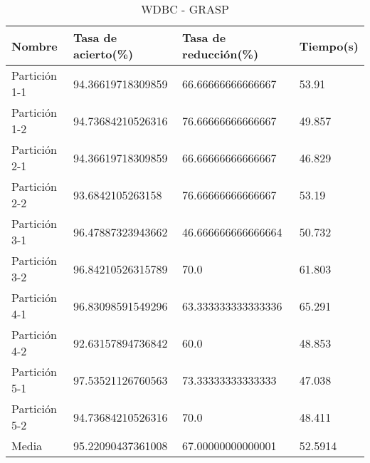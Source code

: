 \begin{table}[H]
	\centering
	\begin{tabular}{l|lll}
		Nombre        & Tasa de acierto(\%) & Tasa de reducción(\%) & Tiempo(s) \\ \hline
		Partición 1-1 & 94.36619718309859   & 66.66666666666667     & 53.91     \\
		Partición 1-2 & 94.73684210526316   & 76.66666666666667     & 49.857    \\
		Partición 2-1 & 94.36619718309859   & 66.66666666666667     & 46.829    \\
		Partición 2-2 & 93.6842105263158    & 76.66666666666667     & 53.19     \\
		Partición 3-1 & 96.47887323943662   & 46.666666666666664    & 50.732    \\
		Partición 3-2 & 96.84210526315789   & 70.0                  & 61.803    \\
		Partición 4-1 & 96.83098591549296   & 63.333333333333336    & 65.291    \\
		Partición 4-2 & 92.63157894736842   & 60.0                  & 48.853    \\
		Partición 5-1 & 97.53521126760563   & 73.33333333333333     & 47.038    \\
		Partición 5-2 & 94.73684210526316   & 70.0                  & 48.411    \\ \hline
		Media         & 95.22090437361008   & 67.00000000000001     & 52.5914
	\end{tabular}
	\caption{WDBC - GRASP}
	\label{WDBC-GRASP}
\end{table}